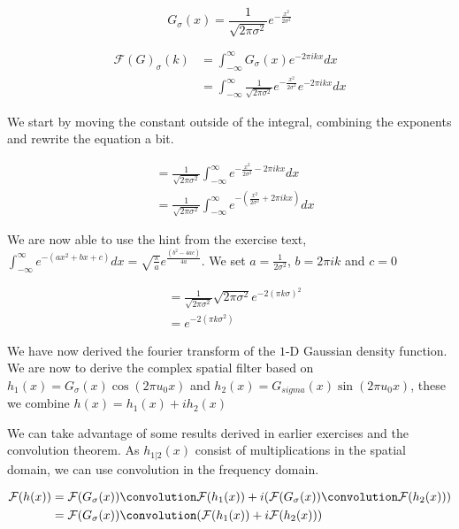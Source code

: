 \documentclass[a4paper, 10pt, final]{article}
\begin{document}
\begin{equation*}
   G_{\sigma}(x) = \frac{1}{\sqrt{2\pi \sigma^{2}}}e^{-\frac{x^{2}}{2\sigma^{2}}}
\end{equation*}

\begin{align*}
  \mathcal{F}(G)_{\sigma}(k) & = \int_{-\infty}^{\infty} G_{\sigma}(x) e^{-2\pi ikx} dx \\ 
&  = \int_{-\infty}^{\infty} \frac{1}{\sqrt{2\pi \sigma^{2}}}e^{-\frac{x^{2}}{2\sigma^{2}}} e^{-2\pi ikx} dx
\end{align*}

We start by moving the constant outside of the integral, combining the exponents and rewrite the equation a bit.

\begin{align*}
  & = \frac{1}{\sqrt{2\pi \sigma^{2}}} \int_{-\infty}^{\infty} e^{-\frac{x^{2}}{2\sigma^{2}}-2\pi ikx} dx \\
  & = \frac{1}{\sqrt{2\pi \sigma^{2}}} \int_{-\infty}^{\infty} e^{-(\frac{x^{2}}{2\sigma^{2}}+2\pi ikx)} dx
\end{align*}

We are now able to use the hint from the exercise text, $\int_{-\infty}^{\infty} e^{-(ax^{2} + bx + c)} dx = \sqrt{\frac{\pi}{a}} e^{\frac{(b^{2} - 4ac)}{4a}}$. We set $a = \frac{1}{2\sigma^{2}}$, $b = 2\pi ik$ and $c = 0$

\begin{align*}
  & = \frac{1}{\sqrt{2\pi \sigma^{2}}} \sqrt{2\pi \sigma^{2}} e^{-2(\pi k \sigma)^{2}} \\
  & = e^{-2(\pi k \sigma^{2})}
\end{align*}

We have now derived the fourier transform of the $1$-D Gaussian density function.
We are now to derive the complex spatial filter based on $h_{1}(x) = G_{\sigma}(x)\cos{(2\pi u_{0}x)}$ and $h_{2}(x) = G_{sigma}(x)\sin{(2\pi u_{0}x)}$, these we combine $h(x) = h_{1}(x) + i h_{2}(x)$

We can take advantage of some results derived in earlier exercises and the convolution theorem. As $h_{1|2}(x)$ consist of multiplications in the spatial domain, we can use convolution in the frequency domain.

\begin{align*}
  \mathcal{F}({h}(x)) & = \mathcal{F}({G}_{\sigma}(x)) \convolution \mathcal{F}(h_{1}(x)) + i(\mathcal{F}(G_{\sigma}(x)) \convolution \mathcal{F}(h_{2}(x))) \\
  & = \mathcal{F}(G_{\sigma}(x)) \convolution (\mathcal{F}(h_{1}(x)) + i \mathcal{F}(h_{2}(x)))
\end{align*}
\end{document}
